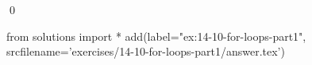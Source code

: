 
\begin{ex}
  \label{ex:14-10-for-loops-part1}
  
  \qed
\end{ex}
\begin{python0}
from solutions import *
add(label="ex:14-10-for-loops-part1",
    srcfilename='exercises/14-10-for-loops-part1/answer.tex')
\end{python0}
